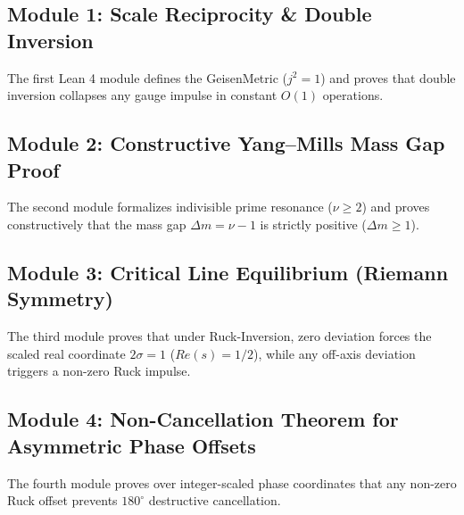 \documentclass[11pt,a4paper,oneside]{article}
\def\text#1{#1}%
\def\texttt#1{#1}%
\theoremstyle{definition}
\begin{document}
\subsection{Module 1: Scale Reciprocity \& Double Inversion}
The first Lean 4 module defines the \texttt{GeisenMetric} ($j^2 = 1$) and proves that double inversion collapses any gauge impulse in constant $O(1)$ operations.
\subsection{Module 2: Constructive Yang–Mills Mass Gap Proof}
The second module formalizes indivisible prime resonance ($\nu \ge 2$) and proves constructively that the mass gap $\Delta m = \nu - 1$ is strictly positive ($\Delta m \ge 1$).
\subsection{Module 3: Critical Line Equilibrium (Riemann Symmetry)}
The third module proves that under Ruck-Inversion, zero deviation forces the scaled real coordinate $2\sigma = 1$ ($\text{Re}(s) = 1/2$), while any off-axis deviation triggers a non-zero Ruck impulse.
\subsection{Module 4: Non-Cancellation Theorem for Asymmetric Phase Offsets}
The fourth module proves over integer-scaled phase coordinates that any non-zero Ruck offset prevents $180^\circ$ destructive cancellation.
\clearpage
\end{document}
